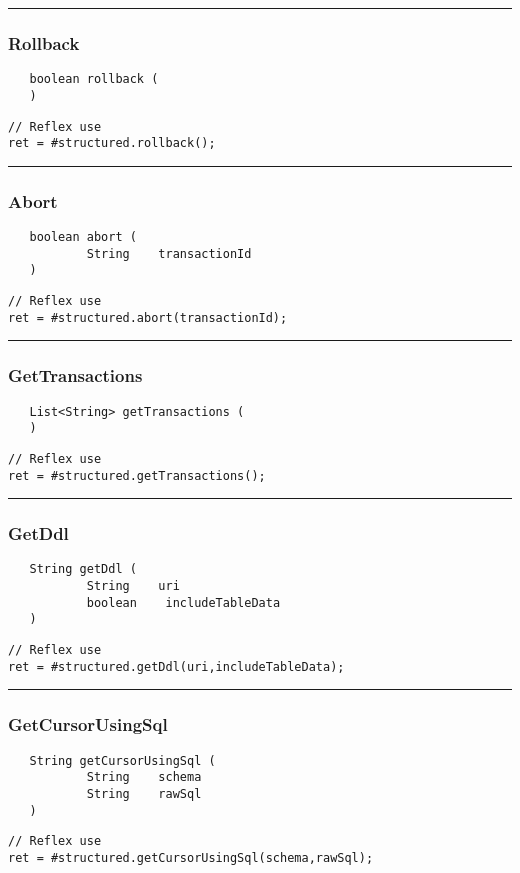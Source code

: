 \rule{15cm}{2pt}
\subsubsection{Rollback}
\label{Api:Rollback}
\begin{verbatim}
   boolean rollback (
   )
\end{verbatim}
\begin{lstlisting}[language=reflex]
// Reflex use
ret = #structured.rollback();
\end{lstlisting}



\rule{15cm}{2pt}
\subsubsection{Abort}
\label{Api:Abort}
\begin{verbatim}
   boolean abort (
           String    transactionId
   )
\end{verbatim}
\begin{lstlisting}[language=reflex]
// Reflex use
ret = #structured.abort(transactionId);
\end{lstlisting}



\rule{15cm}{2pt}
\subsubsection{GetTransactions}
\label{Api:GetTransactions}
\begin{verbatim}
   List<String> getTransactions (
   )
\end{verbatim}
\begin{lstlisting}[language=reflex]
// Reflex use
ret = #structured.getTransactions();
\end{lstlisting}



\rule{15cm}{2pt}
\subsubsection{GetDdl}
\label{Api:GetDdl}
\begin{verbatim}
   String getDdl (
           String    uri
           boolean    includeTableData
   )
\end{verbatim}
\begin{lstlisting}[language=reflex]
// Reflex use
ret = #structured.getDdl(uri,includeTableData);
\end{lstlisting}



\rule{15cm}{2pt}
\subsubsection{GetCursorUsingSql}
\label{Api:GetCursorUsingSql}
\begin{verbatim}
   String getCursorUsingSql (
           String    schema
           String    rawSql
   )
\end{verbatim}
\begin{lstlisting}[language=reflex]
// Reflex use
ret = #structured.getCursorUsingSql(schema,rawSql);
\end{lstlisting}



